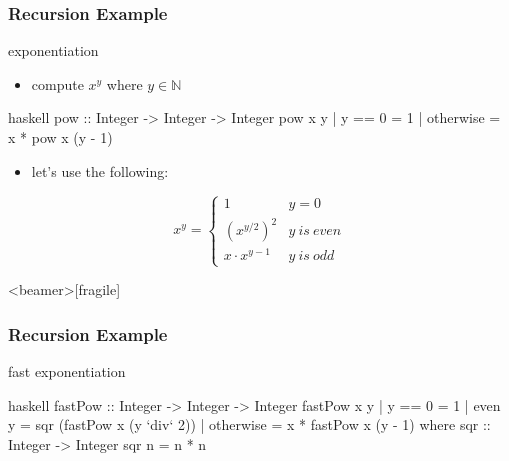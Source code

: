 \documentclass[dvipsnames]{beamer}
\theoremstyle{plain}
\begin{document}
\begin{frame}[fragile]
  \frametitle{Recursion Example}

  \begin{exampleblock}{exponentiation}
    \begin{itemize}
      \item compute $x^y$ where $y \in \mathbb{N}$
    \end{itemize}

    \smallskip
    \begin{pygments}{haskell}
pow :: Integer -> Integer -> Integer
pow x y
  | y == 0    = 1
  | otherwise = x * pow x (y - 1)
    \end{pygments}

    \pause
    \begin{itemize}
      \item let's use the following:
    \end{itemize}
    \begin{equation*}
      x^y = \left\{
        \begin{array}{ll}
          1               & y = 0\\
          {(x^{y/2})}^2   & y~is~even\\
          x \cdot x^{y-1} & y~is~odd
        \end{array}\right.
    \end{equation*}
  \end{exampleblock}
\end{frame}

\begin{frame}<beamer>[fragile]
  \frametitle{Recursion Example}

  \begin{exampleblock}{fast exponentiation}
    \begin{pygments}{haskell}
fastPow :: Integer -> Integer -> Integer
fastPow x y
  | y == 0    = 1
  | even y    = sqr (fastPow x (y `div` 2))
  | otherwise = x * fastPow x (y - 1)
  where
    sqr :: Integer -> Integer
    sqr n = n * n
    \end{pygments}
  \end{exampleblock}
\end{frame}
\end{document}
